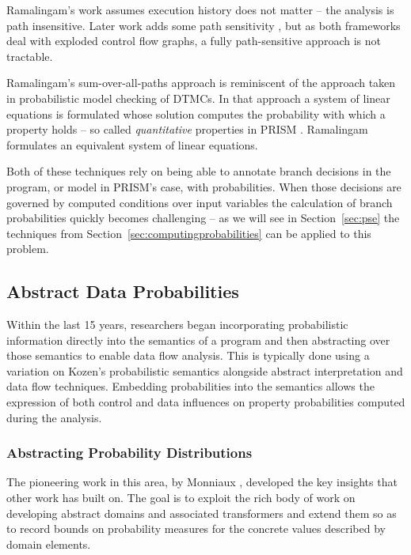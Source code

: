 Ramalingam's work assumes execution history does not matter --  
the analysis is path insensitive.
Later work adds some path sensitivity \cite{mehofer2001novel}, 
but as both frameworks deal with exploded control flow graphs, a fully 
path-sensitive approach is not tractable.

Ramalingam's sum-over-all-paths approach is reminiscent of
the approach taken in probabilistic model checking of DTMCs.
In that approach a system of linear equations is formulated
whose solution computes the probability with which a property
holds -- so called \textit{quantitative} properties in 
PRISM \cite{PRISMmarktoberdorf}.   Ramalingam formulates an
equivalent system of linear equations.  

Both of these techniques rely on being able to annotate
branch decisions in the program, or model in PRISM's case, 
with probabilities.  When those decisions are governed by
computed conditions over input variables the calculation of
branch probabilities quickly becomes challenging -- as we will
see in Section~\ref{sec:pse} the techniques from 
Section~\ref{sec:computingprobabilities} can be applied to
this problem.


\subsection{Abstract Data Probabilities}
Within the last 15 years, researchers 
began incorporating probabilistic information directly into
the semantics of a program and then abstracting over 
those semantics \cite{monniaux2000abstract,others}
to enable data flow analysis.
This is typically done using a variation on Kozen's 
probabilistic semantics \cite{kozen1981semantics} 
alongside abstract interpretation and data flow techniques.
Embedding probabilities into the semantics allows 
the expression of both control and data influences on property
probabilities computed during the analysis.

\subsubsection{Abstracting Probability Distributions}
The pioneering work in this area, by 
Monniaux \cite{monniaux2000abstract,monniaux2001backwards},
developed the key insights that other work has built on. 
The goal is to exploit the rich body of work on developing
abstract domains and associated transformers and extend them
so as to record bounds on probability measures for the concrete values
described by domain elements.


